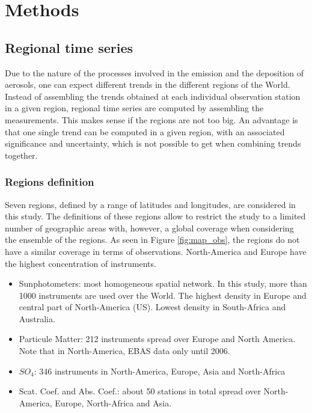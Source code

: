 \documentclass[journal abbreviation, manuscript]{copernicus}
\begin{document}
\section{Methods}

\subsection{Regional time series}
Due to the nature of the processes involved in the emission and the deposition of aerosols, one can expect different trends in the different regions of the World.
Instead of assembling the trends obtained at each individual observation station in a given region, regional time series are computed by assembling the measurements. This makes sense if the regions are not too big. An advantage is that one single trend can be computed in a given region, with an associated significance and uncertainty, which is not possible to get when combining trends together.

\subsubsection{Regions definition}
Seven regions, defined by a range of latitudes and longitudes, are considered in this study. The definitions of these regions allow to restrict the study to a limited number of geographic areas with, however, a global coverage when considering the ensemble of the regions. As seen in Figure \ref{fig:map_obs}, the regions do not have a similar coverage in terms of observations. North-America and Europe have the highest concentration of instruments.
\begin{itemize}
 \item Sunphotometers: most homogeneous spatial network. In this study, more than 1000 instruments are used over the World. The highest density in Europe and central part of North-America (US). Lowest density in South-Africa and Australia.
 \item Particule Matter: 212 instruments spread over Europe and North America. Note that in North-America, EBAS data only until 2006.
 \item $SO_{4}$: 346 instruments in North-America, Europe, Asia and North-Africa
 \item Scat. Coef. and Abs. Coef.: about 50 stations in total spread over North-America, Europe, North-Africa and Asia.
\end{itemize}
\end{document}

